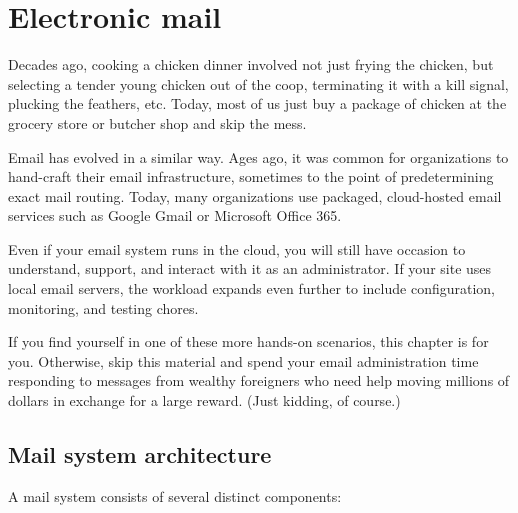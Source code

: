 \chapter{Electronic mail}
\label{chap:email}

Decades ago, cooking a chicken dinner involved not just frying the
chicken, but selecting a tender young chicken out of the coop,
terminating it with a kill signal, plucking the feathers, etc. Today,
most of us just buy a package of chicken at the grocery store or butcher
shop and skip the mess.

Email has evolved in a similar way. Ages ago, it was common for
organizations to hand-craft their email infrastructure, sometimes to the
point of predetermining exact mail routing. Today, many organizations
use packaged, cloud-hosted email services such as
\protect\hypertarget{part0026_split_000.htmlux5cux23_idIndexMarker2382}{}{}Google
Gmail or
\protect\hypertarget{part0026_split_000.htmlux5cux23_idIndexMarker2383}{}{}Microsoft
Office 365.

Even if your email system runs in the cloud, you will still have
occasion to understand, support, and interact with it as an
administrator. If your site uses local email servers, the workload
expands even further to include configuration, monitoring, and testing
chores.

If you find yourself in one of these more hands-on scenarios, this
chapter is for you. Otherwise, skip this material and spend your email
administration time responding to messages from wealthy foreigners who
need help moving millions of dollars in exchange for a large reward.
(Just kidding, of course.)



\section{Mail system architecture}

A mail system consists of several distinct components:

